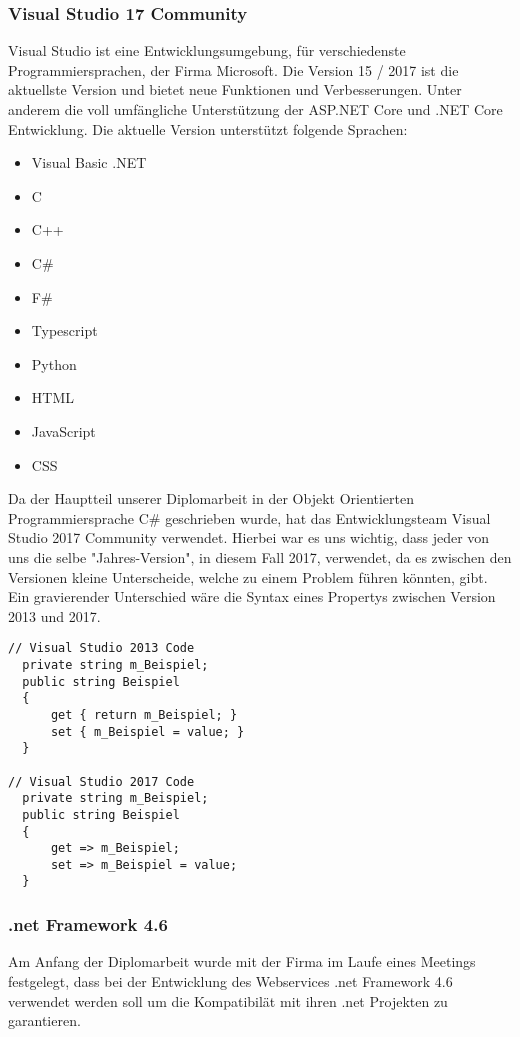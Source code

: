 \documentclass[12pt]{scrartcl}
\begin{document}
\subsubsection {Visual Studio 17 Community}
Visual Studio ist eine Entwicklungsumgebung, für verschiedenste Programmiersprachen, der Firma Microsoft. Die Version 15 / 2017 ist die aktuellste Version und bietet neue Funktionen und Verbesserungen. Unter anderem die voll umfängliche Unterstützung der ASP.NET Core und .NET Core Entwicklung. Die aktuelle Version unterstützt folgende Sprachen:
\begin{itemize}
\item Visual Basic .NET
\item C
\item C++
\item C\#
\item F\#
\item Typescript
\item Python
\item HTML
\item JavaScript
\item CSS
\end{itemize}

Da der Hauptteil unserer Diplomarbeit in der Objekt Orientierten Programmiersprache C\# geschrieben wurde, hat das Entwicklungsteam Visual Studio 2017 Community verwendet. Hierbei war es uns wichtig, dass jeder von uns die selbe "Jahres-Version", in diesem Fall 2017, verwendet, da es zwischen den Versionen kleine Unterscheide, welche zu einem Problem führen könnten, gibt. Ein gravierender Unterschied wäre die Syntax eines Propertys zwischen Version 2013 und 2017. 

\begin{lstlisting}[caption=Syntax Unterschied: Property , label=lst:test]
// Visual Studio 2013 Code
  private string m_Beispiel;
  public string Beispiel
  {
      get { return m_Beispiel; }
      set { m_Beispiel = value; }
  }

// Visual Studio 2017 Code
  private string m_Beispiel;
  public string Beispiel
  {
      get => m_Beispiel;
      set => m_Beispiel = value;
  }
\end{lstlisting}

\subsubsection {.net Framework 4.6}
Am Anfang der Diplomarbeit wurde mit der Firma im Laufe eines Meetings festgelegt, dass bei der Entwicklung des Webservices .net Framework 4.6 verwendet werden soll um die Kompatibilät mit ihren .net Projekten zu garantieren.
\end{document}
